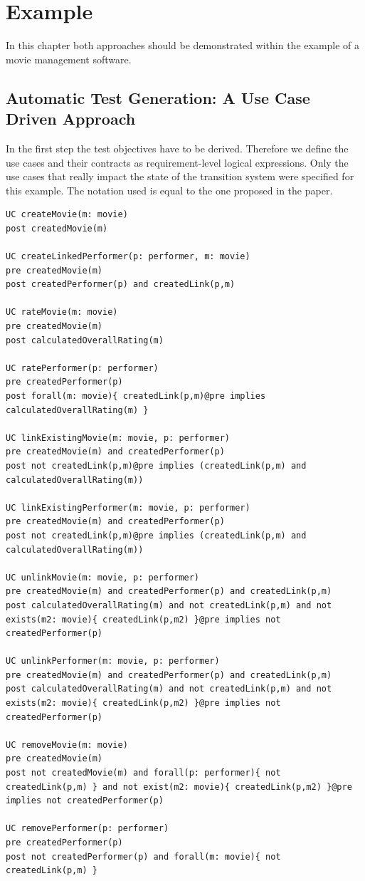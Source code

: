 \section{Example}

In this chapter both approaches should be demonstrated within the example of a movie management software.  

\subsection{Automatic Test Generation: A Use Case Driven Approach}

In the first step the test objectives have to be derived. Therefore we define the use cases and their contracts as requirement-level logical expressions. Only the use cases that really impact the state of the transition system were specified for this example. The notation used is equal to the one proposed in the paper. 

\begin{lstlisting}
UC createMovie(m: movie)
post createdMovie(m)

UC createLinkedPerformer(p: performer, m: movie)
pre createdMovie(m)
post createdPerformer(p) and createdLink(p,m)

UC rateMovie(m: movie)
pre createdMovie(m)
post calculatedOverallRating(m)

UC ratePerformer(p: performer)
pre createdPerformer(p)
post forall(m: movie){ createdLink(p,m)@pre implies calculatedOverallRating(m) }

UC linkExistingMovie(m: movie, p: performer)
pre createdMovie(m) and createdPerformer(p)
post not createdLink(p,m)@pre implies (createdLink(p,m) and calculatedOverallRating(m))

UC linkExistingPerformer(m: movie, p: performer)
pre createdMovie(m) and createdPerformer(p)
post not createdLink(p,m)@pre implies (createdLink(p,m) and calculatedOverallRating(m))

UC unlinkMovie(m: movie, p: performer)
pre createdMovie(m) and createdPerformer(p) and createdLink(p,m)
post calculatedOverallRating(m) and not createdLink(p,m) and not exists(m2: movie){ createdLink(p,m2) }@pre implies not createdPerformer(p)

UC unlinkPerformer(m: movie, p: performer)
pre createdMovie(m) and createdPerformer(p) and createdLink(p,m)
post calculatedOverallRating(m) and not createdLink(p,m) and not exists(m2: movie){ createdLink(p,m2) }@pre implies not createdPerformer(p)

UC removeMovie(m: movie)
pre createdMovie(m)
post not createdMovie(m) and forall(p: performer){ not createdLink(p,m) } and not exist(m2: movie){ createdLink(p,m2) }@pre implies not createdPerformer(p)

UC removePerformer(p: performer)
pre createdPerformer(p)
post not createdPerformer(p) and forall(m: movie){ not createdLink(p,m) }
\end{lstlisting}

